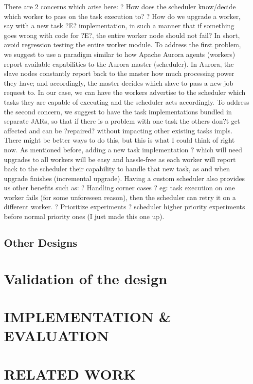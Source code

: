\documentclass[sigconf]{acmart}
\begin{document}
There are 2 concerns which arise here:
?	How does the scheduler know/decide which worker to pass on the task execution to?
?	How do we upgrade a worker, say with a new task ?E? implementation, in such a manner that if something goes wrong with code for ?E?, the entire worker node should not fail? In short, avoid regression testing the entire worker module.
To address the first problem, we suggest to use a paradigm similar to how Apache Aurora agents (workers) report available capabilities to the Aurora master (scheduler). In Aurora, the slave nodes constantly report back to the master how much processing power they have; and accordingly, the master decides which slave to pass a new job request to. In our case, we can have the workers advertise to the scheduler which tasks they are capable of executing and the scheduler acts accordingly.
To address the second concern, we suggest to have the task implementations bundled in separate JARs, so that if there is a problem with one task the others don?t get affected and can be ?repaired? without impacting other existing tasks impls. There might be better ways to do this, but this is what I could think of right now.
As mentioned before, adding a new task implementation ? which will need upgrades to all workers will be easy and hassle-free as each worker will report back to the scheduler their capability to handle that new task, as and when upgrade finishes (incremental upgrade). Having a custom scheduler also provides us other benefits such as:
?	Handling corner cases ? eg: task execution on one worker fails (for some unforeseen reason), then the scheduler can retry it on a different worker.
?	Prioritize experiments ? scheduler higher priority experiments before normal priority ones (I just made this one up).

\subsection{Other Designs}

\section{Validation of the design}

\section{IMPLEMENTATION \& EVALUATION}

\section{RELATED WORK}
\end{document}
